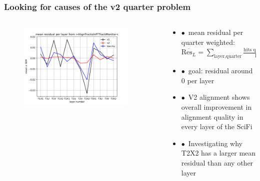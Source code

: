 \documentclass[aspectratio=1610, 12pt, xcolor=dvipsnames]{beamer}
\begin{document}
\begin{frame}\frametitle{Looking for causes of the v2 quarter problem}
    \begin{columns}
      \begin{column}[c]{0.48\textwidth}
        \begin{figure}
          \centering
          \includegraphics[width=0.9\textwidth]{2023-mar-9-DPG/meanResidual_AlignTracks_weighted.pdf}
        \end{figure}
      \end{column}
      \begin{column}{0.48\textwidth}
        \begin{itemize}
          \item $\bullet$\, mean residual per quarter weighted: $
              \overline{\text{Res}_{L}} = \sum_{\text{layer}, \text{quarter}} \frac{\text{hits quarter of layer}}{\text{hits layer}}$
          \item $\bullet$\, goal: residual around 0 per layer
          \item $\bullet$\, V2 alignment shows overall improvement in alignment quality in every layer of the SciFi
          \item $\bullet$\, Investigating why T2X2 has a larger mean residual than any other layer
        \end{itemize}
      \end{column}
    \end{columns}
\end{frame}
\end{document}

